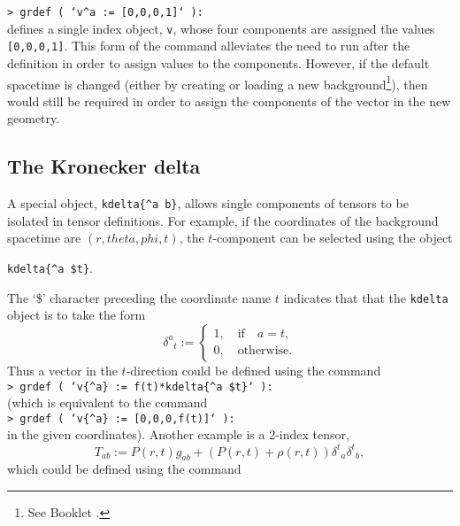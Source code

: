 \documentclass{article}
\begin{document}
\noindent\texttt{> grdef ( `v{\^{}a} := [0,0,0,1]` ):}\\

\noindent defines a single index object, \texttt{v}, whose four components
are assigned the values \texttt{[0,0,0,1]}. This form of the
 command alleviates the need to run  after
the definition in order to assign values to the components. However,
if the default spacetime is changed (either by creating or loading a
new background\footnote{See Booklet \grMakegRef.}), then
 would still be required in order to assign the
components of the vector in the new geometry.
%
\subsection*{The Kronecker delta}
%
A special object, \texttt{kdelta\{\^{}a b\}}, allows single components
of tensors to be isolated in tensor definitions. For example, if the
coordinates of the background spacetime are $(r,theta,phi,t)$, the
$t$-component can be selected using the object\\
\begin{center}
  \texttt{kdelta\{\^{}a \$t\}}.\\
\end{center}
The `\$' character preceding the coordinate name $t$ indicates that that
the \texttt{kdelta} object is to take the form
\[
  \delta^a{}_t :=
    \left\{
      \begin{array}{l}
        1, \quad\text{if}\quad a=t,\\
        0, \quad\text{otherwise}.
      \end{array}
    \right.
\]
Thus a vector in the $t$-direction could be defined using the
command\\

\noindent\texttt{> grdef ( `v\{\^{}a\} := f(t)*kdelta\{\^{}a \$t\}` ):}\\

\noindent (which is equivalent to the command\\

\noindent\texttt{> grdef ( `v\{\^{}a\} := [0,0,0,f(t)]` ):}\\

\noindent in the given coordinates). Another example is a 2-index tensor,
\[
  T_{ab} := P(r,t) g_{ab} + (P(r,t) + \rho(r,t)) \delta^t{}_a \delta^t{}_b,
\]
which could be defined using the command\\
\end{document}
